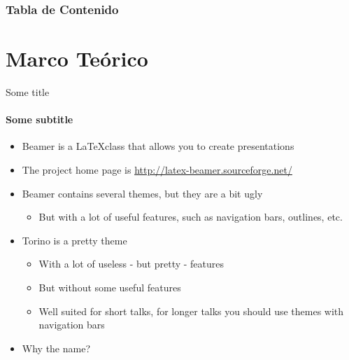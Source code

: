 
   \begin{frame}[plain]
   \titlepage %
   \end{frame}


   \begin{frame}
   \frametitle{Tabla de Contenido} %
   \tableofcontents %
   \end{frame}


   \section{Marco Teórico}  %
   \begin{frame}{Some title} %
   \framesubtitle{Some subtitle}
      \begin{itemize}
         \item Beamer is a \LaTeX class that allows you to create presentations
         \item The project home page is \url{http://latex-beamer.sourceforge.net/}
         \item Beamer contains several themes, but they are a bit ugly
          \begin{itemize}
             \item But with a lot of useful features, such as navigation bars, outlines, etc.
          \end{itemize}
         \item Torino is a pretty theme
          \begin{itemize}
             \item With a lot of useless - but pretty - features
             \item But without some useful features
             \item Well suited for short talks, for longer talks you should use themes with navigation bars
          \end{itemize}
          \item Why the name?
      \end{itemize}
   \end{frame}

